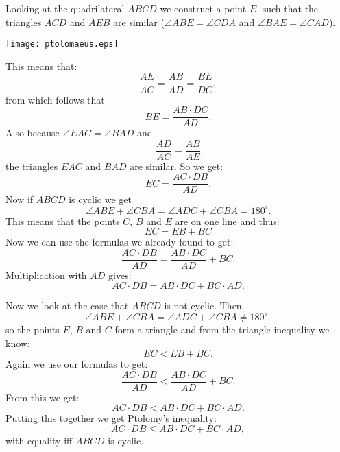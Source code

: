 \documentclass[12pt]{article}
\begin{document}
Looking at the quadrilateral $ABCD$ we construct a point $E$, such that the triangles $ACD$ and $AEB$ are similar ($\angle ABE=\angle CDA$ and $\angle BAE=\angle CAD$).
\begin{center}
\texttt{[image: ptolomaeus.eps]}
\end{center}
This means that:
$$\frac{AE}{AC}=\frac{AB}{AD}=\frac{BE}{DC},$$
from which follows that
$$BE=\frac{AB\cdot DC}{AD}.$$
Also because $\angle EAC=\angle BAD$ and 
$$\frac{AD}{AC}=\frac{AB}{AE}$$
the triangles $EAC$ and $BAD$ are similar. So we get:
$$EC=\frac{AC\cdot DB}{AD}.$$
Now if $ABCD$ is cyclic we get
$$\angle ABE+\angle CBA=\angle ADC+\angle CBA=180^\circ.$$
This means that the points $C$, $B$ and $E$ are on one line and thus:
$$EC=EB+BC$$
Now we can use the formulas we already found to get:
$$\frac{AC\cdot DB}{AD}=\frac{AB\cdot DC}{AD}+BC.$$
Multiplication with $AD$ gives:
$$AC\cdot DB=AB\cdot DC+BC\cdot AD.$$

Now we look at the case that $ABCD$ is not cyclic. Then
$$\angle ABE+\angle CBA=\angle ADC+\angle CBA\neq 180^\circ,$$
so the points $E$, $B$ and $C$ form a triangle and from the triangle inequality we know:
$$EC<EB+BC.$$
Again we use our formulas to get:
$$\frac{AC\cdot DB}{AD}<\frac{AB\cdot DC}{AD}+BC.$$
From this we get:
$$AC\cdot DB<AB\cdot DC+BC\cdot AD.$$
Putting this together we get Ptolomy's inequality:
$$AC\cdot DB\leq AB\cdot DC+BC\cdot AD,$$
with equality iff $ABCD$ is cyclic.
\end{document}

